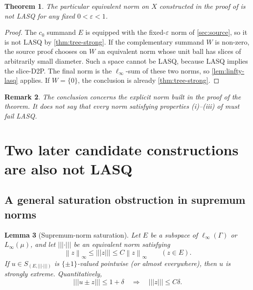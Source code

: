 \documentclass[11pt]{article}
\newtheorem{theorem}{Theorem}[section]
\newtheorem{lemma}[theorem]{Lemma}
\newtheorem{remark}[theorem]{Remark}
\newcommand{\eps}{\varepsilon}
\newcommand{\norm}[1]{\left\lVert #1\right\rVert}
\newcommand{\newnorm}[1]{\left\lvert\!\left\lvert\!\left\lvert #1\right\rvert\!\right\rvert\!\right\rvert}
\begin{document}
\begin{theorem}
\label{thm:full-source-not-lasq}
The particular equivalent norm on $X$ constructed in the proof of \cite[Theorem~1.2]{RodriguezRueda2023} is not LASQ for any fixed $0<\eps<1$.
\end{theorem}

\begin{proof}
The $c_0$ summand $E$ is equipped with the fixed-$\eps$ norm of \cref{sec:source}, so it is not LASQ by \cref{thm:tree-strong}.  If the complementary summand $W$ is non-zero, the source proof chooses on $W$ an equivalent norm whose unit ball has slices of arbitrarily small diameter.  Such a space cannot be LASQ, because LASQ implies the slice-D2P.  The final norm is the $\ell_\infty$-sum of these two norms, so \cref{lem:linfty-lasq} applies.  If $W=\{0\}$, the conclusion is already \cref{thm:tree-strong}.
\end{proof}

\begin{remark}
The conclusion concerns the explicit norm built in the proof of the theorem.  It does not say that every norm satisfying properties (i)--(iii) of \cite[Theorem~1.2]{RodriguezRueda2023} must fail LASQ.
\end{remark}

\section{Two later candidate constructions are also not LASQ}
\label{sec:candidates}

\subsection{A general saturation obstruction in supremum norms}

\begin{lemma}[Supremum-norm saturation]
\label{lem:sup-saturation}
Let $E$ be a subspace of $\ell_\infty(\Gamma)$ or $L_\infty(\mu)$, and let $\newnorm{\cdot}$ be an equivalent norm satisfying
\begin{equation}
\label{eq:sup-equivalence}
 \norm{z}_\infty\le\newnorm{z}\le C\norm{z}_\infty
 \qquad(z\in E).
\end{equation}
If $u\in S_{(E,\newnorm{\cdot})}$ is $\{\pm1\}$-valued pointwise (or almost everywhere), then $u$ is strongly extreme.  Quantitatively,
\[
 \newnorm{u\pm z}\le1+\delta
 \quad\Longrightarrow\quad
 \newnorm{z}\le C\delta.
\]
\end{lemma}
\end{document}
